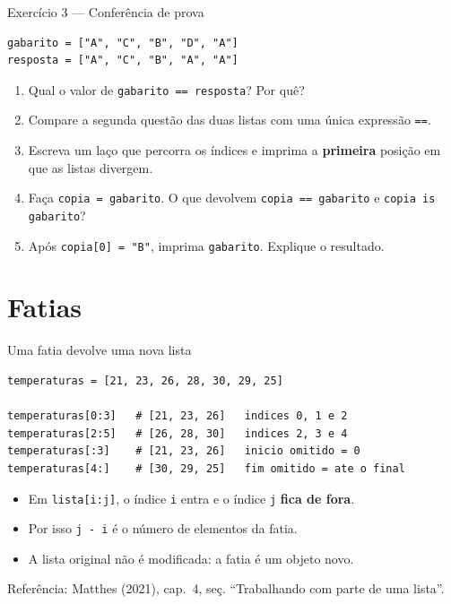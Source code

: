 \documentclass[aspectratio=169]{beamer}
\newcommand{\fonte}[1]{\vfill{\scriptsize\color{UFSGray}Refer\^encia: #1}}
\begin{document}
\begin{frame}[fragile]{Exercício 3 --- Conferência de prova}
\begin{lstlisting}
gabarito = ["A", "C", "B", "D", "A"]
resposta = ["A", "C", "B", "A", "A"]
\end{lstlisting}

\begin{enumerate}
  \item Qual o valor de \texttt{gabarito == resposta}? Por quê?
  \item Compare a segunda questão das duas listas com uma única expressão \texttt{==}.
  \item Escreva um laço que percorra os índices e imprima a \textbf{primeira} posição em que as listas divergem.
  \item Faça \texttt{copia = gabarito}. O que devolvem \texttt{copia == gabarito} e \texttt{copia is gabarito}?
  \item Após \texttt{copia[0] = "B"}, imprima \texttt{gabarito}. Explique o resultado.
\end{enumerate}
\end{frame}

\section{Fatias}

\begin{frame}[fragile]{Uma fatia devolve uma nova lista}
\begin{lstlisting}
temperaturas = [21, 23, 26, 28, 30, 29, 25]

temperaturas[0:3]   # [21, 23, 26]   indices 0, 1 e 2
temperaturas[2:5]   # [26, 28, 30]   indices 2, 3 e 4
temperaturas[:3]    # [21, 23, 26]   inicio omitido = 0
temperaturas[4:]    # [30, 29, 25]   fim omitido = ate o final
\end{lstlisting}

\begin{itemize}
  \item Em \texttt{lista[i:j]}, o índice \texttt{i} entra e o índice \texttt{j} \textbf{fica de fora}.
  \item Por isso \texttt{j - i} é o número de elementos da fatia.
  \item A lista original não é modificada: a fatia é um objeto novo.
\end{itemize}

\fonte{Matthes (2021), cap.\ 4, se\c{c}. ``Trabalhando com parte de uma lista''.}
\end{frame}
\end{document}
